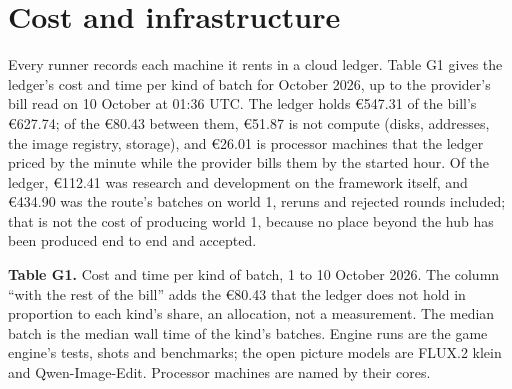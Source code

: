 \section{Cost and infrastructure}\label{cost-and-infrastructure}

Every runner records each machine it rents in a cloud ledger. Table G1 gives the ledger's cost and time per kind of batch for October 2026, up to the provider's bill read on 10 October at 01:36 UTC. The ledger holds €547.31 of the bill's €627.74; of the €80.43 between them, €51.87 is not compute (disks, addresses, the image registry, storage), and €26.01 is processor machines that the ledger priced by the minute while the provider bills them by the started hour. Of the ledger, €112.41 was research and development on the framework itself, and €434.90 was the route's batches on world 1, reruns and rejected rounds included; that is not the cost of producing world 1, because no place beyond the hub has been produced end to end and accepted.

\textbf{Table G1.} Cost and time per kind of batch, 1 to 10 October 2026. The column ``with the rest of the bill'' adds the €80.43 that the ledger does not hold in proportion to each kind's share, an allocation, not a measurement. The median batch is the median wall time of the kind's batches. Engine runs are the game engine's tests, shots and benchmarks; the open picture models are FLUX.2 klein and Qwen-Image-Edit. Processor machines are named by their cores.

